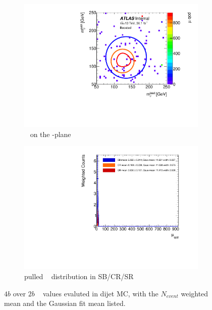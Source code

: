 \begin{figure}[htbp!]
\centering
\captionsetup{justification=centering}
	\hspace{-1cm}
    \begin{subfigure}[b]{0.4\textwidth}
        \includegraphics[width=\textwidth,angle=-90]{figures/boosted/AppendixMuqcdstudy/QCD_FourTag_Incl_mH0H1.pdf}
        \caption{\muqcd~ on the \mleadJ-\msublJ plane}
        \label{fig:app-muqcd-4b-2d-qcd}
    \end{subfigure}
    \quad \quad \quad \quad 
    \begin{subfigure}[b]{0.4\textwidth}
        \includegraphics[width=\textwidth,angle=-90]{figures/boosted/AppendixMuqcdstudy/QCD_FourTag_Incl_mH0H1_pull.pdf}
        \caption{pulled \muqcd~ distribution in SB/CR/SR}
        \label{fig:app-muqcd-4b-pull-qcd}
    \end{subfigure}
\caption{$4b$ over $2b$ \muqcd~ values evaluted in dijet MC, with the $N_{event}$ weighted mean and the Gaussian fit mean listed.}
\label{fig:app-muqcd-4b-qcd}
\end{figure}